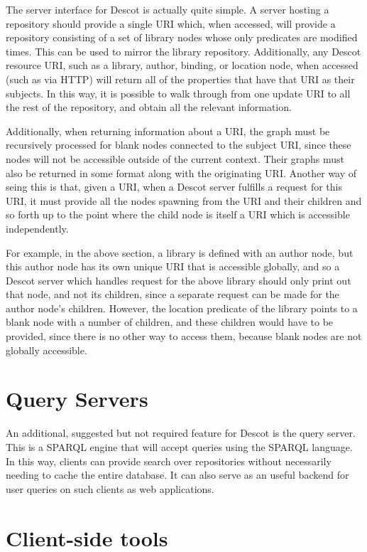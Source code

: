 The server interface for Descot is actually quite simple. A server 
hosting a repository should provide a single URI which, when accessed, 
will provide a repository consisting of a set of library nodes 
whose only predicates are modified times.  This can be used to 
mirror the library repository. Additionally, any Descot resource 
URI, such as a library, author, binding, or location node, when 
accessed (such as via HTTP) will return all of the properties that 
have that URI as their subjects.  In this way, it is possible to 
walk through from one update URI to all the rest of the repository, 
and obtain all the relevant information. 

Additionally, when returning information about a URI, the graph must 
be recursively processed for blank nodes connected to the subject 
URI, since these nodes will not be accessible outside of the current 
context. Their graphs must also be returned in some format along 
with the originating URI.
Another way of seing this is that, given a URI, 
when a Descot server fulfills a request for this URI, 
it must provide all the nodes spawning from the URI 
and their children and so forth up to the point where the child node 
is itself a URI which is accessible independently.

For example, in the above section, a library is defined with an 
author node, but this author node has its own unique URI that is 
accessible globally, and so a Descot server which handles request 
for the above library should only print out that node, and not 
its children, since a separate request can be made for the author 
node's children. However, the location predicate of the library 
points to a blank node with a number of children, and these children 
would have to be provided, since there is no other way to access 
them, because blank nodes are not globally accessible. 

\section{Query Servers}

An additional, suggested but not required feature for Descot is 
the query server. This is a SPARQL \cite{sparql} engine that will 
accept queries using the SPARQL language.  
In this way, clients can provide search 
over repositories without necessarily needing to cache the entire 
database.  It can also serve as an useful backend for user 
queries on such clients as web applications. 

\section{Client-side tools}


